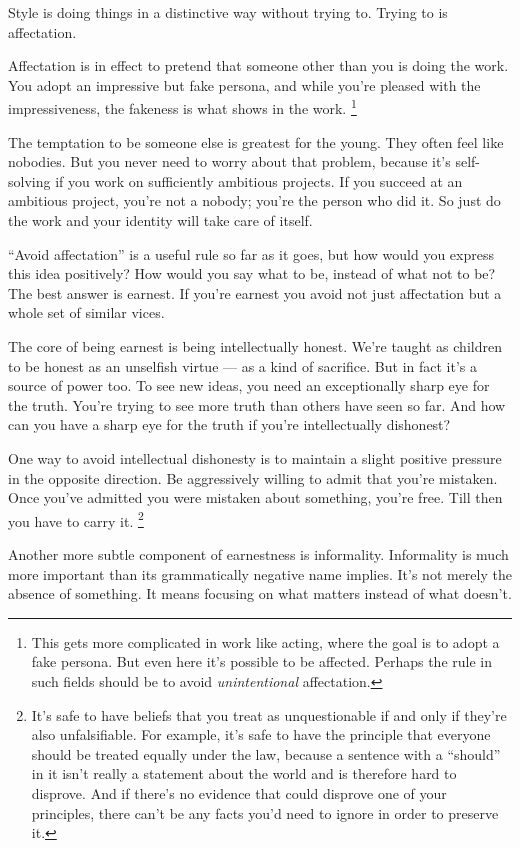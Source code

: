 \documentclass[12pt]{book}
\begin{document}
Style is doing things in a distinctive way without trying to. Trying to
is affectation.

Affectation is in effect to pretend that someone other than you is doing
the work. You adopt an impressive but fake persona, and while you're
pleased with the impressiveness, the fakeness is what shows in the work.
\footnote{This gets more complicated in work like acting, where the goal
is to adopt a fake persona. But even here it's possible to be affected.
Perhaps the rule in such fields should be to avoid \emph{unintentional}
affectation.}

The temptation to be someone else is greatest for the young. They often
feel like nobodies. But you never need to worry about that problem,
because it's self-solving if you work on sufficiently ambitious
projects. If you succeed at an ambitious project, you're not a nobody;
you're the person who did it. So just do the work and your identity will
take care of itself.

``Avoid affectation'' is a useful rule so far as it goes, but how would
you express this idea positively? How would you say what to be, instead
of what not to be? The best answer is earnest. If you're earnest you
avoid not just affectation but a whole set of similar vices.

The core of being earnest is being intellectually honest. We're taught
as children to be honest as an unselfish virtue --- as a kind of
sacrifice. But in fact it's a source of power too. To see new ideas, you
need an exceptionally sharp eye for the truth. You're trying to see more
truth than others have seen so far. And how can you have a sharp eye for
the truth if you're intellectually dishonest?

One way to avoid intellectual dishonesty is to maintain a slight
positive pressure in the opposite direction. Be aggressively willing to
admit that you're mistaken. Once you've admitted you were mistaken about
something, you're free. Till then you have to carry it.
\footnote{It's safe to have beliefs that you treat as unquestionable if
and only if they're also unfalsifiable. For example, it's safe to have
the principle that everyone should be treated equally under the law,
because a sentence with a ``should'' in it isn't really a statement
about the world and is therefore hard to disprove. And if there's no
evidence that could disprove one of your principles, there can't be any
facts you'd need to ignore in order to preserve it.}

Another more subtle component of earnestness is informality. Informality
is much more important than its grammatically negative name implies.
It's not merely the absence of something. It means focusing on what
matters instead of what doesn't.
\end{document}
